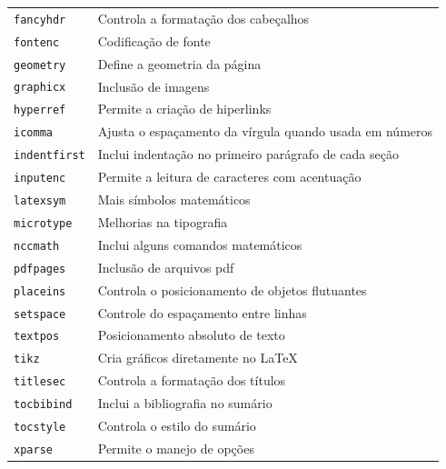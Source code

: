 \documentclass[fleqn]{profmat-cefet}
\begin{document}
\begin{center}
\begin{longtable}{ll}
        \lstinline!fancyhdr!    & Controla a formatação dos cabeçalhos                         \\ 
        \lstinline!fontenc!     & Codificação de fonte                                         \\
        \lstinline!geometry!    & Define a geometria da página                                 \\
        \lstinline!graphicx!    & Inclusão de imagens                                          \\
        \lstinline!hyperref!    & Permite a criação de hiperlinks                              \\
        \lstinline!icomma!      & Ajusta o espaçamento da vírgula quando usada em números      \\
        \lstinline!indentfirst! & Inclui indentação no primeiro parágrafo de cada seção        \\
        \lstinline!inputenc!    & Permite a leitura de caracteres com acentuação               \\
        \lstinline!latexsym!    & Mais símbolos matemáticos                                    \\
        \lstinline!microtype!   & Melhorias na tipografia                                      \\
        \lstinline!nccmath!     & Inclui alguns comandos matemáticos                           \\
        \lstinline!pdfpages!    & Inclusão de arquivos \textsf{pdf}                            \\
        \lstinline!placeins!    & Controla o posicionamento de objetos flutuantes              \\
        \lstinline!setspace!    & Controle do espaçamento entre linhas                         \\
        \lstinline!textpos!     & Posicionamento absoluto de texto                             \\
        \lstinline!tikz!        & Cria gráficos diretamente no \LaTeX                          \\
        \lstinline!titlesec!    & Controla a formatação dos títulos                            \\
        \lstinline!tocbibind!   & Inclui a bibliografia no sumário                             \\
        \lstinline!tocstyle!    & Controla o estilo do sumário                                 \\
        \lstinline!xparse!      & Permite o manejo de opções                                   \\
        \hline
    \end{longtable}
\end{center}
\end{document}
